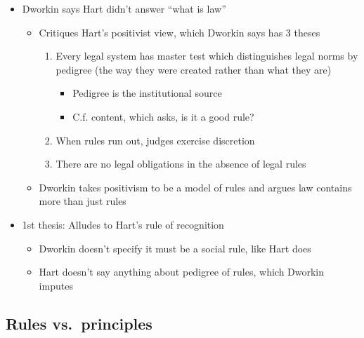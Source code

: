 \begin{itemize}
\tightlist
\item
  Dworkin says Hart didn't answer ``what is law''

  \begin{itemize}
  \tightlist
  \item
    Critiques Hart's positivist view, which Dworkin says has 3 theses

    \begin{enumerate}
    \def\labelenumi{\arabic{enumi}.}
    \tightlist
    \item
      Every legal system has master test which distinguishes legal norms
      by pedigree (the way they were created rather than what they are)

      \begin{itemize}
      \tightlist
      \item
        Pedigree is the institutional source
      \item
        C.f. content, which asks, is it a good rule?
      \end{itemize}
    \item
      When rules run out, judges exercise discretion
    \item
      There are no legal obligations in the absence of legal rules
    \end{enumerate}
  \item
    Dworkin takes positivism to be a model of rules and argues law
    contains more than just rules
  \end{itemize}
\item
  1st thesis: Alludes to Hart's rule of recognition

  \begin{itemize}
  \tightlist
  \item
    Dworkin doesn't specify it must be a social rule, like Hart does
  \item
    Hart doesn't say anything about pedigree of rules, which Dworkin
    imputes
  \end{itemize}
\end{itemize}

\hypertarget{rules-vs.-principles}{%
\subsection{Rules vs.~principles}\label{rules-vs.-principles}}

